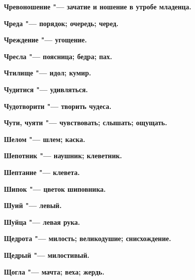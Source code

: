 \bfseries Чревоношение \normalfont{} "--- зачатие и ношение в утробе младенца. 




\bfseries Чреда \normalfont{} "--- порядок; очередь; черед. 




\bfseries Чреждение \normalfont{} "--- угощение. 




\bfseries Чресла \normalfont{} "--- поясница; бедра; пах. 




\bfseries Чтилище \normalfont{} "--- идол; кумир. 




\bfseries Чудитися \normalfont{} "--- удивляться. 




\bfseries Чудотворити \normalfont{} "--- творить чудеса. 




\bfseries Чути, чуяти \normalfont{} "--- чувствовать; слышать; ощущать. 




 





\bfseries Шелом \normalfont{} "--- шлем; каска. 




\bfseries Шепотник \normalfont{} "--- наушник; клеветник. 




\bfseries Шептание \normalfont{} "--- клевета. 




\bfseries Шипок \normalfont{} "--- цветок шиповника. 




\bfseries Шуий \normalfont{} "--- левый. 




\bfseries Шуйца \normalfont{} "--- левая рука. 




 





\bfseries Щедрота \normalfont{} "--- милость; великодушие; снисхождение. 




\bfseries Щедрый \normalfont{} "--- милостивый. 




\bfseries Щогла \normalfont{} "--- мачта; веха; жердь. 




